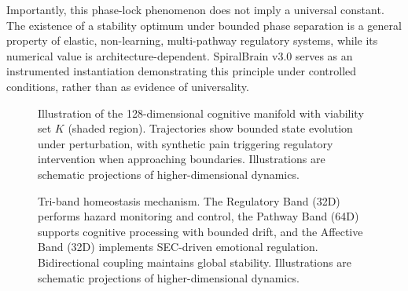 \documentclass[12pt,a4paper]{report}
\begin{document}
Importantly, this phase-lock phenomenon does not imply a universal constant. The existence of a stability optimum under bounded phase separation is a general property of elastic, non-learning, multi-pathway regulatory systems, while its numerical value is architecture-dependent. SpiralBrain v3.0 serves as an instrumented instantiation demonstrating this principle under controlled conditions, rather than as evidence of universality.

\begin{figure}[H]
\centering
{}
\caption{Illustration of the 128-dimensional cognitive manifold with viability set $K$ (shaded region). Trajectories show bounded state evolution under perturbation, with synthetic pain triggering regulatory intervention when approaching boundaries. Illustrations are schematic projections of higher-dimensional dynamics.}
\label{fig:manifold}
\end{figure}

\begin{figure}[t]
\centering
{}
\caption{Tri-band homeostasis mechanism. The Regulatory Band (32D) performs hazard monitoring and control, the Pathway Band (64D) supports cognitive processing with bounded drift, and the Affective Band (32D) implements SEC-driven emotional regulation. Bidirectional coupling maintains global stability. Illustrations are schematic projections of higher-dimensional dynamics.}
\label{fig:tri_band}
\end{figure}
\end{document}
